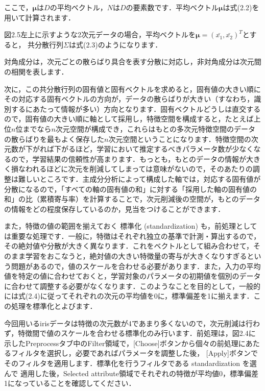 ここで，$\bm{\mu}$は$D$の平均ベクトル，$N$は$D$の要素数です．平均ベクトル$\bm{\mu}$は式(2.2)を用いて計算されます．


図2.5左上に示すような2次元データの場合，平均ベクトルを$\bm{\mu}=(\bar{x_1}, \bar{x_2})^T$とすると，
共分散行列$\Sigma$は式(2.3)のようになります．


対角成分は，次元ごとの散らばり具合を表す分散に対応し，非対角成分は次元間の相関を表します．

次に，この共分散行列の固有値と固有ベクトルを求めると，固有値の大きい順にその対応する固有ベクトルの方向が，データの散らばりが大きい（すなわち，識別するにあたって情報が多い）方向となります．固有ベクトルどうしは直交するので，固有値の大きい順に軸として採用し，特徴空間を構成すると，たとえば上位$n$位までなら$n$次元空間が構成でき，これらはもとの多次元特徴空間のデータの散らばりを最もよく保存した$n$次元空間ということになります．特徴空間の次元数が下がれば下がるほど，学習において推定するべきパラメータ数が少なくなるので，学習結果の信頼性が高まります．もっとも，もとのデータの情報が大きく損なわれるほどに次元を削減してしまっては意味がないので，そのあたりの調整は難しいところです．主成分分析によって構成した軸では，対応する固有値が分散になるので，「すべての軸の固有値の和」に対する「採用した軸の固有値の和」の比（累積寄与率）を計算することで，次元削減後の空間が，もとのデータの情報をどの程度保存しているのか，見当をつけることができます．


また，特徴の値の範囲を揃えておく
標準化 (standardization)
も，前処理としては重要な処理です．一般に，特徴はそれぞれ独立の基準で計測・算出するので，その絶対値や分散が大きく異なります．これをベクトルとして組み合わせて，そのまま学習をおこなうと，絶対値の大きい特徴量の寄与が大きくなりすぎるという問題があるので，値のスケールを合わせる必要があります．また，入力の平均値を特定の値に合わせておくと，学習対象のパラメータの初期値を個別のデータに合わせて調整する必要がなくなります．このようなことを目的として，一般的には式(2.4)に従ってそれぞれの次元の平均値を0に，標準偏差を1に揃えます．この処理を標準化とよびます．



今回用いるirisデータは特徴の次元数が4であまり多くないので，次元削減は行わず，特徴間で値のスケールを合わせる標準化のみ行います．前処理は，図2.4に示したPreprocessタブ中のFilter領域で，[Choose]ボタンから個々の前処理にあたるフィルタを選択し，必要であればパラメータを調整した後，
[Apply]ボタンでそのフィルタを適用します．標準化を行うフィルタである standardization を選んで
適用した後，Selected attribute領域でそれぞれの特徴が平均値0，標準偏差1になっていることを確認してください．

